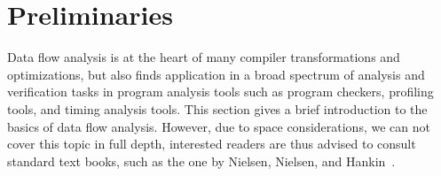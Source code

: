 %
%

\section{Preliminaries}
\label{novillo:sec:preliminaries}

Data flow analysis is at the heart of many compiler transformations and
optimizations, but also finds application in a broad spectrum of analysis and
verification tasks in program analysis tools such as program checkers, profiling
tools, and timing analysis tools. This section gives a brief introduction to the
basics of data flow analysis. However, due to space considerations, we can not
cover this topic in full depth, interested readers are thus advised to consult
standard text books, such as the one by Nielsen, Nielsen, and
Hankin~\cite{novillo:bib:NNH99}.

